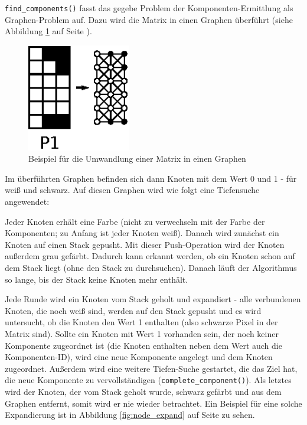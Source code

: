 \verb+find_components()+ fasst das gegebe Problem der Komponenten-Ermittlung als Graphen-Problem auf. Dazu wird die Matrix in einen Graphen überführt (siehe Abbildung \ref{fig:matrix_graph} auf Seite \pageref{fig:matrix_graph}).

\begin{figure}[tbhp]
	\centering
	\includegraphics[width=0.4\textwidth]{images/matrix_graph.eps}
	\caption{Beispiel für die Umwandlung einer Matrix in einen Graphen}
	\label{fig:matrix_graph}
\end{figure}

Im überführten Graphen befinden sich dann Knoten mit dem Wert 0 und 1 - für weiß und schwarz. Auf diesen Graphen wird wie folgt eine Tiefensuche angewendet:

Jeder Knoten erhält eine Farbe (nicht zu verwechseln mit der Farbe der Komponenten; zu Anfang ist jeder Knoten weiß). Danach wird zunächst ein Knoten auf einen Stack gepusht. Mit dieser Push-Operation wird der Knoten außerdem grau gefärbt. Dadurch kann erkannt werden, ob ein Knoten schon auf dem Stack liegt (ohne den Stack zu durchsuchen). Danach läuft der Algorithmus so lange, bis der Stack keine Knoten mehr enthält.

Jede Runde wird ein Knoten vom Stack geholt und expandiert - alle verbundenen Knoten, die noch weiß sind, werden auf den Stack gepusht und es wird untersucht, ob die Knoten den Wert 1 enthalten (also schwarze Pixel in der Matrix sind). Sollte ein Knoten mit Wert 1 vorhanden sein, der noch keiner Komponente zugeordnet ist (die Knoten enthalten neben dem Wert auch die Komponenten-ID), wird eine neue Komponente angelegt und dem Knoten zugeordnet. Außerdem wird eine weitere Tiefen-Suche gestartet, die das Ziel hat, die neue Komponente zu vervollständigen (\verb+complete_component()+). Als letztes wird der Knoten, der vom Stack geholt wurde, schwarz gefärbt und aus dem Graphen entfernt, somit wird er nie wieder betrachtet. Ein Beispiel für eine solche Expandierung ist in Abbildung \ref{fig:node_expand} auf Seite \pageref{fig:node_expand} zu sehen.

